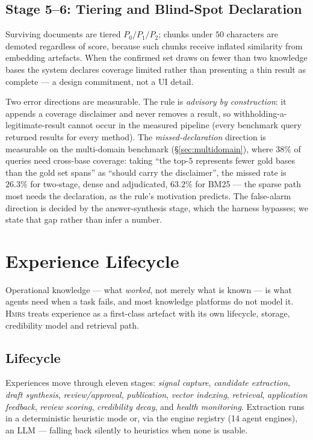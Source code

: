 \documentclass[sigconf, review, anonymous]{acmart}
\newcommand{\sys}{\textsc{Hmrs}}
\begin{document}
\subsection{Stage 5--6: Tiering and Blind-Spot Declaration}\label{sec:blindspot}
Surviving documents are tiered $P_0/P_1/P_2$; chunks under $50$ characters are
demoted regardless of score, because such chunks receive inflated similarity
from embedding artefacts. When the confirmed set draws on fewer than two
knowledge bases the system declares coverage limited rather than presenting a
thin result as complete --- a design commitment, not a UI detail.

Two error directions are measurable. The rule is \emph{advisory by
construction}: it appends a coverage disclaimer and never removes a result, so
withholding-a-legitimate-result cannot occur in the measured pipeline (every
benchmark query returned results for every method). The
\emph{missed-declaration} direction is measurable on the multi-domain benchmark
(\S\ref{sec:multidomain}), where $38\%$ of queries need cross-base coverage:
taking ``the top-$5$ represents fewer gold bases than the gold set spans'' as
``should carry the disclaimer'', the missed rate is $26.3\%$ for two-stage,
dense and adjudicated, $63.2\%$ for BM25 --- the sparse path most needs the
declaration, as the rule's motivation predicts. The false-alarm direction is
decided by the answer-synthesis stage, which the harness bypasses; we state
that gap rather than infer a number.

\section{Experience Lifecycle}\label{sec:experience}

Operational knowledge --- what \emph{worked}, not merely what is known --- is
what agents need when a task fails, and most knowledge platforms do not model
it. \sys{} treats experience as a first-class artefact with its own lifecycle,
storage, credibility model and retrieval path.

\subsection{Lifecycle}\label{sec:lifecycle}
Experiences move through eleven stages: \emph{signal capture}, \emph{candidate
extraction}, \emph{draft synthesis}, \emph{review/approval},
\emph{publication}, \emph{vector indexing}, \emph{retrieval}, \emph{application
feedback}, \emph{review scoring}, \emph{credibility decay}, and \emph{health
monitoring}. Extraction runs in a deterministic heuristic mode or, via the
engine registry (14 agent engines), an LLM --- falling back silently to
heuristics when none is usable.
\end{document}
